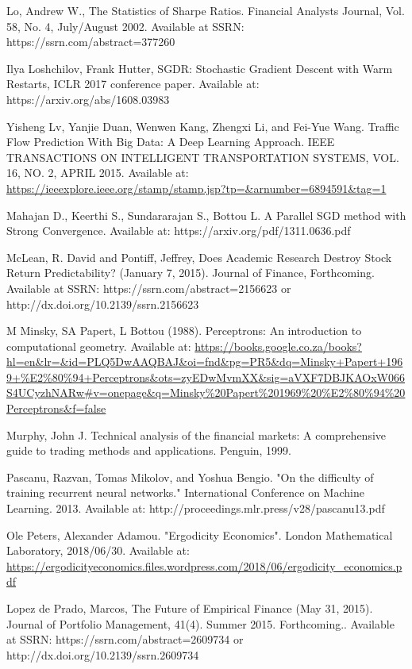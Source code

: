 \documentclass[a4paper,11pt,oneside]{article}
\theoremstyle{plain}
\theoremstyle{definition}
\begin{document}
\begin{thebibliography}{bibliography}
Lo, Andrew W., The Statistics of Sharpe Ratios. Financial Analysts Journal, Vol. 58, No. 4, July/August 2002. Available at SSRN: https://ssrn.com/abstract=377260

Ilya Loshchilov, Frank Hutter, SGDR: Stochastic Gradient Descent with Warm Restarts, ICLR 2017 conference paper. Available at: https://arxiv.org/abs/1608.03983


Yisheng Lv, Yanjie Duan, Wenwen Kang, Zhengxi Li, and Fei-Yue Wang. Traffic Flow Prediction With Big Data:
A Deep Learning Approach. IEEE TRANSACTIONS ON INTELLIGENT TRANSPORTATION SYSTEMS, VOL. 16, NO. 2, APRIL 
2015. Available at: \url{https://ieeexplore.ieee.org/stamp/stamp.jsp?tp=&arnumber=6894591&tag=1}

Mahajan D., Keerthi S., Sundararajan S., Bottou L. A Parallel SGD method with Strong 
Convergence. Available at: https://arxiv.org/pdf/1311.0636.pdf

McLean, R. David and Pontiff, Jeffrey, Does Academic Research Destroy Stock Return Predictability? (January 7, 2015). Journal of Finance, Forthcoming. Available at SSRN: https://ssrn.com/abstract=2156623 or http://dx.doi.org/10.2139/ssrn.2156623

M Minsky, SA Papert, L Bottou (1988). Perceptrons: An introduction to computational  geometry. Available at: \url{https://books.google.co.za/books?hl=en&lr=&id=PLQ5DwAAQBAJ&oi=fnd&pg=PR5&dq=Minsky+Papert+1969+%E2%80%94+Perceptrons&ots=zyEDwMvmXX&sig=aVXF7DBJKAOxW066S4UCyzhNARw#v=onepage&q=Minsky%20Papert%201969%20%E2%80%94%20Perceptrons&f=false}

Murphy, John J. Technical analysis of the financial markets: A comprehensive guide to trading methods and applications. Penguin, 1999.

Pascanu, Razvan, Tomas Mikolov, and Yoshua Bengio. "On the difficulty of training recurrent neural networks." International Conference on Machine Learning. 2013.
Available at: http://proceedings.mlr.press/v28/pascanu13.pdf

Ole Peters, Alexander Adamou. "Ergodicity Economics". London Mathematical Laboratory, 2018/06/30. Available at: \url{https://ergodicityeconomics.files.wordpress.com/2018/06/ergodicity_economics.pdf}

Lopez de Prado, Marcos, The Future of Empirical Finance (May 31, 2015). Journal of Portfolio Management, 41(4). Summer 2015. Forthcoming.. Available at SSRN: https://ssrn.com/abstract=2609734 or http://dx.doi.org/10.2139/ssrn.2609734


\end{thebibliography}
\end{document}
